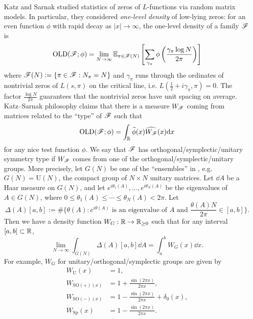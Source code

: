Katz and Sarnak \cite{katz1999zeroes,katz2023random} studied statistics of zeros of $L$-functions via random matrix models.
In particular, they considered \emph{one-level density} of low-lying zeros: for an even function $\phi$ with rapid decay as $|x| \to \infty$, the one-level density of a family $\mathscr{F}$ is
\begin{equation}
    \mathrm{OLD}(\mathscr{F}; \phi) = \lim_{N \to \infty} \mathbb{E}_{\pi \in \mathscr{F}(N)} \left[\sum_{\gamma_\pi} \phi\left(\frac{\gamma_\pi \log N}{2 \pi}\right)\right]
\end{equation}
where $\mathscr{F}(N) := \{\pi \in \mathscr{F}: N_\pi = N\}$ and $\gamma_\pi$ runs through the ordinates of nontrivial zeros of $L(s, \pi)$ on the critical line, i.e. $L\left(\frac{1}{2} + i\gamma_\pi, \pi\right) = 0$.
The factor $\frac{\log N}{2\pi}$ guarantees that the nontrivial zeros have unit spacing on average.
Katz--Sarnak philosophy claims that there is a measure $W_{\mathscr{F}}$ coming from matrices related to the ``type'' of $\mathscr{F}$ such that
\begin{equation}
    \mathrm{OLD}(\mathscr{F}; \phi) = \int_{\mathbb{R}} \widehat{\phi}(x) \widehat{W_{\mathscr{F}}}(x) \mathrm{d} x
\end{equation}
for any nice test function $\phi$.
We say that $\mathscr{F}$ has orthogonal/symplectic/unitary symmetry type if $W_{\mathscr{F}}$ comes from one of the orthogonal/symplectic/unitary groups.
More precisely, let $G(N)$ be one of the ``ensembles'' in \cite[Table 1]{katz1999zeroes}, e.g. $G(N) = \mathrm{U}(N)$, the compact group of $N \times N$ unitary matrices.
Let $\dd A$ be a Haar measure on $G(N)$, and let $e^{i \theta_1(A)}, \ldots, e^{i \theta_{N}(A)}$ be the eigenvalues of $A \in G(N)$, where $0 \le \theta_1(A) \le \cdots \le \theta_N(A) < 2\pi$.
Let
\[
\Delta(A)[a, b]  := \#\{\theta(A) : e^{i\theta(A)}\text{ is an eigenvalue of }A \text{ and } \frac{\theta(A)N}{2\pi} \in [a, b]\}.
\]
Then we have a density function $W_G : \mathbb{R} \to \mathbb{R}_{\ge 0}$ such that for any interval $[a, b] \subset \mathbb{R}$,
\[
\lim_{N \to \infty} \int_{G(N)} \Delta(A)[a, b] \dd A = \int_a^b W_G(x) \dd x.
\]
For example, $W_G$ for unitary/orthogonal/symplectic groups are given by
\begin{align}
    \label{eqn:WG}
    W_{\mathrm{U}}(x) &= 1, \\
    W_{\mathrm{SO(+)}(x)} &= 1 + \frac{\sin(2\pi x)}{2\pi x}, \\
    W_{\mathrm{SO(-)}(x)} &= 1 - \frac{\sin(2\pi x)}{2\pi x} + \delta_0(x), \\
    W_{\mathrm{Sp}}(x) &= 1 - \frac{\sin(2\pi x)}{2\pi x}.
\end{align}


